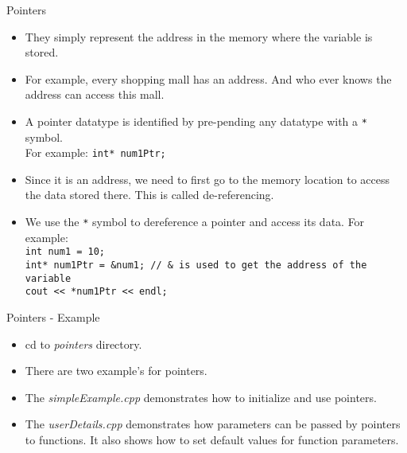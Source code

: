 \documentclass[aspectratio=169]{beamer}
\begin{document}
\begin{frame}[fragile]{Pointers}
	\begin{itemize}
		\item They simply represent the address in the memory where the variable is stored.
		\item For example, every shopping mall has an address. And who ever knows the address can access this mall.
		\item A pointer datatype is identified by pre-pending any datatype with a \verb|*| symbol. \\For example: \verb|int* num1Ptr;|
		\item Since it is an address, we need to first go to the memory location to access the data stored there. This is called de-referencing.
		\item We use the \verb|*| symbol to dereference a pointer and access its data. For example:\\ \verb|int num1 = 10;| \\ \verb|int* num1Ptr = &num1; // & is used to get the address of the variable| \\ \verb|cout << *num1Ptr << endl;|
	\end{itemize}
\end{frame}

\begin{frame}[fragile]{Pointers - Example}
	\begin{itemize}
		\item cd to \textit{pointers} directory.
		\item There are two example's for pointers.
		\item The \textit{simpleExample.cpp} demonstrates how to initialize and use pointers.
		\item The \textit{userDetails.cpp} demonstrates how parameters can be passed by pointers to functions. It also shows how to set default values for function parameters.
	\end{itemize}
\end{frame}
\end{document}
